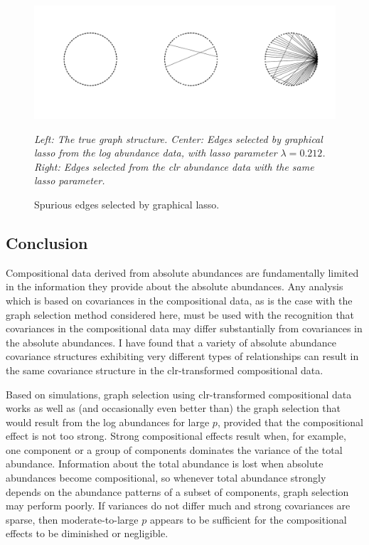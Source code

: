\documentclass[12pt]{article}
\begin{document}
\begin{figure}
\caption{Spurious edges selected by graphical lasso.}
\label{f:spurious}
\begin{center}
\includegraphics[width=6.5in]{figs/var-dom-band.pdf}
\begin{small}
\textit{Left: The true graph structure. Center: Edges selected by graphical lasso from the log abundance data, with lasso parameter $\lambda = 0.212$. Right: Edges selected from the clr abundance data with the same lasso parameter.}
\end{small}
\end{center}
\end{figure}

\subsection*{Conclusion}

Compositional data derived from absolute abundances are fundamentally limited in the information they provide about the absolute abundances. Any analysis which is based on covariances in the compositional data, as is the case with the graph selection method considered here, must be used with the recognition that covariances in the compositional data may differ substantially from covariances in the absolute abundances. I have found that a variety of absolute abundance covariance structures exhibiting very different types of relationships can result in the same covariance structure in the clr-transformed compositional data.

Based on simulations, graph selection using clr-transformed compositional data works as well as (and occasionally even better than) the graph selection that would result from the log abundances for large $p$, provided that the compositional effect is not too strong. Strong compositional effects result when, for example, one component or a group of components dominates the variance of the total abundance. Information about the total abundance is lost when absolute abundances become compositional, so whenever total abundance strongly depends on the abundance patterns of a subset of components, graph selection may perform poorly. If variances do not differ much and strong covariances are sparse, then moderate-to-large $p$ appears to be sufficient for the compositional effects to be diminished or negligible.

\pagebreak


\end{document}
